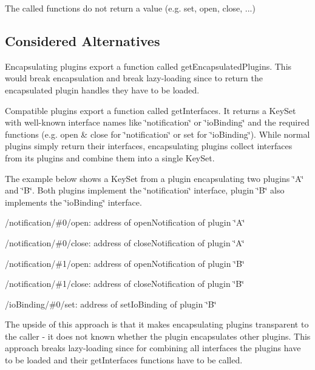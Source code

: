 \begin{DoxyEnumerate}
\item The called functions do not return a value (e.\+g. {\ttfamily set}, {\ttfamily open}, {\ttfamily close}, ...)
\end{DoxyEnumerate}

\subsection*{Considered Alternatives}


\begin{DoxyItemize}
\item Encapsulating plugins export a function called {\ttfamily get\+Encapsulated\+Plugins}. This would break encapsulation and break lazy-\/loading since to return the encapsulated plugin handles they have to be loaded.
\item Compatible plugins export a function called {\ttfamily get\+Interfaces}. It returns a Key\+Set with well-\/known interface names like \char`\"{}notification\char`\"{} or \char`\"{}io\+Binding\char`\"{} and the required functions (e.\+g. {\ttfamily open} \& {\ttfamily close} for \char`\"{}notification\char`\"{} or {\ttfamily set} for \char`\"{}io\+Binding\char`\"{}). While normal plugins simply return their interfaces, encapsulating plugins collect interfaces from its plugins and combine them into a single Key\+Set.

The example below shows a Key\+Set from a plugin encapsulating two plugins \char`\"{}\+A\char`\"{} and \char`\"{}\+B\char`\"{}. Both plugins implement the \char`\"{}notification\char`\"{} interface, plugin \char`\"{}\+B\char`\"{} also implements the \char`\"{}io\+Binding\char`\"{} interface.
\begin{DoxyItemize}
\item {\ttfamily /notification/\#0/open}\+: address of {\ttfamily open\+Notification} of plugin \char`\"{}\+A\char`\"{}
\item {\ttfamily /notification/\#0/close}\+: address of {\ttfamily close\+Notification} of plugin \char`\"{}\+A\char`\"{}
\item {\ttfamily /notification/\#1/open}\+: address of {\ttfamily open\+Notification} of plugin \char`\"{}\+B\char`\"{}
\item {\ttfamily /notification/\#1/close}\+: address of {\ttfamily close\+Notification} of plugin \char`\"{}\+B\char`\"{}
\item {\ttfamily /io\+Binding/\#0/set}\+: address of {\ttfamily set\+Io\+Binding} of plugin \char`\"{}\+B\char`\"{}
\end{DoxyItemize}

The upside of this approach is that it makes encapsulating plugins transparent to the caller -\/ it does not known whether the plugin encapsulates other plugins. This approach breaks lazy-\/loading since for combining all interfaces the plugins have to be loaded and their {\ttfamily get\+Interfaces} functions have to be called.
\end{DoxyItemize}

